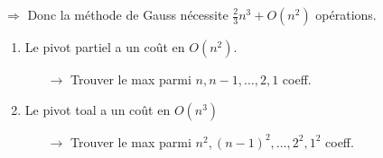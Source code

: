 \documentclass[a4paper,11pt]{article}
\theoremstyle{plain} %
\begin{document}
$\Rightarrow$ Donc la méthode de Gauss nécessite $\frac{2}{3}n^3+O(n^2)$ opérations.

\vspace{0.5cm}
\begin{remark}
    \begin{enumerate}
        \item Le pivot partiel a un coût en $O(n^2)$.
            \begin{itemize}
                \item [$\rightarrow$] Trouver le max parmi $n,n-1, \dots, 2, 1$ coeff.
            \end{itemize}

        \item Le pivot toal a un coût en $O(n^3)$
            \begin{itemize}
                \item [$\rightarrow$] Trouver le max parmi $n^2, (n-1)^2, \dots , 2^2, 1^2$ coeff.
            \end{itemize}
    \end{enumerate}
\end{remark}
\end{document}
